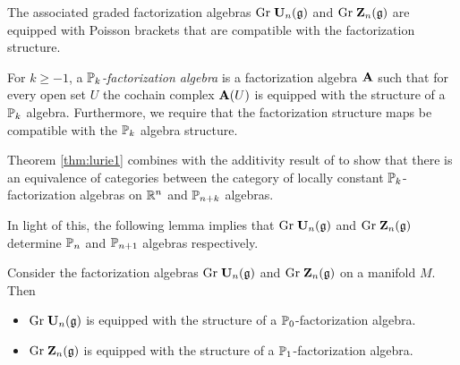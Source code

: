 \documentclass[11pt]{amsart}
\numberwithin{equation}{section}
\begin{document}
The associated graded factorization algebras ${\rm Gr} \; \mathbf U_n (\mathfrak g)$ and ${\rm Gr} \; \mathbf Z_n(\mathfrak g)$ are equipped with Poisson brackets that are compatible with the factorization structure. 

For $k \geq -1$, a {\em $\mathbb P_k$-factorization algebra} is a factorization algebra $\mathbf A$ such that for every open set $U$ the cochain complex $\mathbf A(U)$ is equipped with the structure of a $\mathbb P_k$ algebra. 
Furthermore, we require that the factorization structure maps be compatible with the $\mathbb P_k$ algebra structure. 

Theorem \ref{thm:lurie1} combines with the additivity result of \cite{SafronovAdd} to show that there is an equivalence of categories between the category of locally constant $\mathbb P_k$-factorization algebras on $\mathbb R^n$ and $\mathbb P_{n+k}$ algebras.  

In light of this, the following lemma implies that ${\rm Gr} \; \mathbf U_n (\mathfrak g)$ and ${\rm Gr} \; \mathbf Z_n(\mathfrak g)$ determine $\mathbb P_n$ and $\mathbb P_{n+1}$ algebras respectively. 

\begin{lmm}
\label{lmm:pois1}
Consider the factorization algebras ${\rm Gr} \; \mathbf U_n (\mathfrak g)$ and ${\rm Gr} \; \mathbf Z_n(\mathfrak g)$ on a manifold $M$.
Then
\begin{itemize}
\item ${\rm Gr} \; \mathbf U_n (\mathfrak g)$ is equipped with the structure of a $\mathbb P_0$-factorization algebra.
\item ${\rm Gr} \; \mathbf Z_n(\mathfrak g)$ is equipped with the structure of a $\mathbb P_1$-factorization algebra.
\end{itemize}
\end{lmm}
\end{document}
